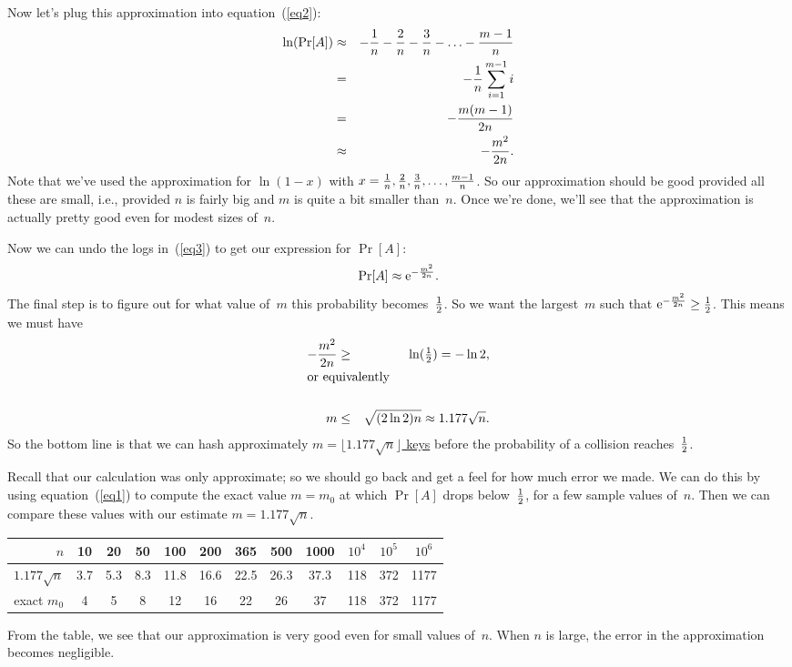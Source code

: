 \documentclass[11pt]{article}
\def\half{{\textstyle{1\over 2}}}
\def\ul#1{\underline{#1}}
\begin{document}
Now let's plug this approximation into equation~(\ref{eq2}):
\begin{eqnarray}
   \ln(\Pr[A]) &\approx& -{1\over n} -{2\over n} -{3\over n} -\ldots
                                              -{{m-1}\over n}\nonumber\\
               &=&       -{1\over n}\sum_{i=1}^{m-1} i\nonumber\\
               &=&       -{{m(m-1)}\over{2n}}\nonumber\\
               &\approx& -{{m^2}\over{2n}}.\label{eq3}
\end{eqnarray}
Note that we've used the approximation for $\ln(1-x)$ with 
$x={1\over n},{2\over n},{3\over n},\ldots,{{m-1}\over n}$.  So our
approximation should be good provided all these are small, i.e., provided
$n$ is fairly big and $m$ is quite a bit smaller than~$n$.  Once we're
done, we'll see that the approximation is actually pretty good even for
modest sizes of~$n$.  

Now we can undo the logs in~(\ref{eq3}) to get our expression for $\Pr[A]$:
$$    \Pr[A]\approx{\rm e}^{-{{m^2}\over{2n}}}.  $$
The final step is to figure out for what value of~$m$ this probability
becomes~$\half$.  So we want the largest~$m$ such that
${\rm e}^{-{{m^2}\over{2n}}}\ge\half$.  This means we must have
\begin{eqnarray}
   -{{m^2}\over{2n}}&\ge&\ln(\half) = -\ln 2,\label{eqadd}\\
         \noalign{\hbox{\rm or equivalently}}\nonumber\\
                    m&\le&\sqrt{(2\ln 2)n}\approx 1.177\sqrt{n}.\label{eqadd2}
\end{eqnarray}
So the bottom line is that we can hash approximately 
\ul{$m=\lfloor 1.177\sqrt{n}\rfloor$ keys} 
before the probability of a collision reaches~$\half$.

Recall that our calculation was only approximate; so we should go back
and get a feel for how much error we made.  We can do this by 
using equation~(\ref{eq1}) to compute the exact value 
$m=m_0$ at which $\Pr[A]$ drops below~$\half$, for a few sample 
values of~$n$.  Then we can compare these values with our
estimate $m=1.177\sqrt{n}$.
\begin{center}\begin{tabular}{|r|ccccccccccc|}
\hline
$n$           &10&20&50&100&200&365&500&1000&$10^4$&$10^5$&$10^6$\\\hline
$1.177\sqrt{n}$&3.7&5.3&8.3&11.8&16.6&22.5&26.3&37.3&118&372&1177\\
exact $m_0$   &4&5&8&12&16&22&26&37&118&372&1177\\\hline
\end{tabular}\end{center}
From the table, we see that our approximation is very good even for 
small values of~$n$.
When $n$ is large, the error in the approximation becomes negligible.
\end{document}
